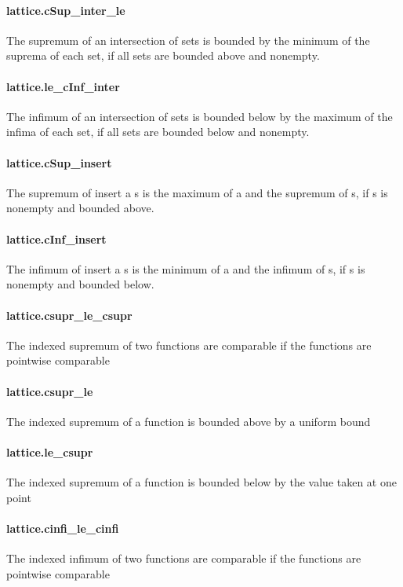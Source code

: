 \documentclass{article}
\begin{document}
\paragraph{lattice.cSup\_inter\_le}
\par
The supremum of an intersection of sets is bounded by the minimum of the suprema of each
set, if all sets are bounded above and nonempty.
\paragraph{lattice.le\_cInf\_inter}
\par
The infimum of an intersection of sets is bounded below by the maximum of the
infima of each set, if all sets are bounded below and nonempty.
\paragraph{lattice.cSup\_insert}
\par
The supremum of insert a s is the maximum of a and the supremum of s, if s is
nonempty and bounded above.
\paragraph{lattice.cInf\_insert}
\par
The infimum of insert a s is the minimum of a and the infimum of s, if s is
nonempty and bounded below.
\paragraph{lattice.csupr\_le\_csupr}
\par
The indexed supremum of two functions are comparable if the functions are pointwise comparable
\paragraph{lattice.csupr\_le}
\par
The indexed supremum of a function is bounded above by a uniform bound
\paragraph{lattice.le\_csupr}
\par
The indexed supremum of a function is bounded below by the value taken at one point
\paragraph{lattice.cinfi\_le\_cinfi}
\par
The indexed infimum of two functions are comparable if the functions are pointwise comparable
\end{document}
